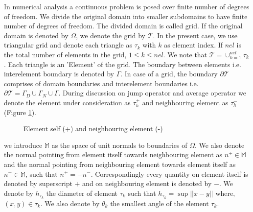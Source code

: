 \documentclass[a4paper,oneside,openright,spanish,english]{book}
\begin{document}
In numerical analysis a continuous problem is posed over finite number of degrees of freedom. We divide the original domain into smaller subdomains to have finite number of degrees of freedom. The divided domain is called grid. If the original domain is denoted by $\Omega$, we denote the grid by $\mathcal{T}$. In the present case, we use triangular grid and denote each triangle as $\tau_k$ with $k$ as element index. If $nel$ is the total number of elements in the grid, $1\leq k \leq nel$. We note that $\mathcal{T} = \cup_{k=1}^{nel} \tau_k$. Each triangle is an 'Element' of the grid. The boundary between elements i.e. interelement boundary is denoted by $\Gamma$. In case of a grid, the boundary $\partial \mathcal{T}$ comprises of domain boundaries and interelement boundaries i.e. $\partial \mathcal{T} = \Gamma_D \cup \Gamma_N \cup \Gamma$. During discussion on jump operator and average operator we denote the element under consideration as $\tau_{h}^+$ and neighbouring element as $\tau_{h}^-$ (Figure \ref{fig:Self_neighbour}).

\begin{figure}
\centering
{}
\caption{Element self (+) and neighbouring element (-)}
\label{fig:Self_neighbour}
\end{figure}

we introduce $\mathbb{M}$ as the space of unit normals to boundaries of $\Omega$. We also denote the normal pointing from element itself towards neighbouring element as $n^+ \in \mathbb{M}$ and the normal pointing from neighbouring element towards element itself as $n^- \in \mathbb{M}$, such that $n^+ = - n^-$. Correspondingly every quantity on element itself is denoted by superscript $+$ and on neighbouring element is denoted by $-$.  We denote by $h_{\tau_k}$ the diameter of element $\tau_k$ such that $h_{\tau_k} = \sup ||x-y||$ where, $(x,y) \in \tau_k$. We also denote by $\theta_k$ the smallest angle of the element $\tau_k$.
\end{document}
